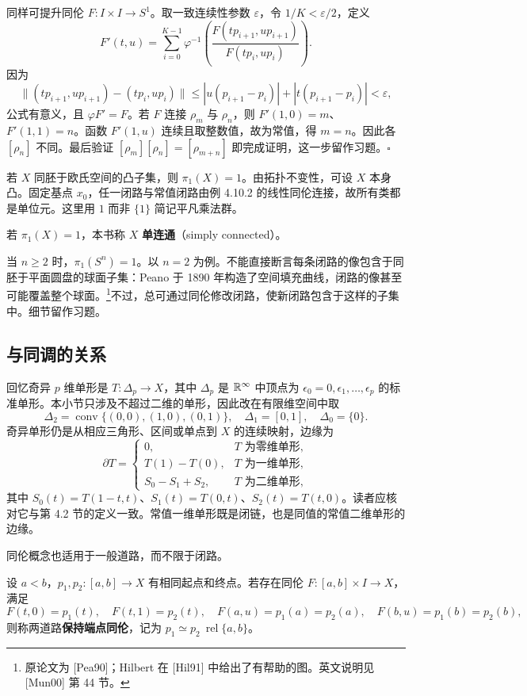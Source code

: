 同样可提升同伦 $F:I\times I\to S^1$。取一致连续性参数 $\varepsilon$，令 $1/K<\varepsilon/2$，定义
\[
F'(t,u)=\sum_{i=0}^{K-1}\varphi^{-1}\left(\frac{F(tp_{i+1},up_{i+1})}{F(tp_i,up_i)}\right).
\]
因为
\[
\|(tp_{i+1},up_{i+1})-(tp_i,up_i)\|
\le |u(p_{i+1}-p_i)|+|t(p_{i+1}-p_i)|<\varepsilon,
\]
公式有意义，且 $\varphi F'=F$。若 $F$ 连接 $\rho_m$ 与 $\rho_n$，则 $F'(1,0)=m$、$F'(1,1)=n$。函数 $F'(1,u)$ 连续且取整数值，故为常值，得 $m=n$。因此各 $[\rho_n]$ 不同。最后验证 $[\rho_m][\rho_n]=[\rho_{m+n}]$ 即完成证明，这一步留作习题。\hfill$\square$

若 $X$ 同胚于欧氏空间的凸子集，则 $\pi_1(X)=1$。由拓扑不变性，可设 $X$ 本身凸。固定基点 $x_0$，任一闭路与常值闭路由例 4.10.2 的线性同伦连接，故所有类都是单位元。这里用 $1$ 而非 $\{1\}$ 简记平凡乘法群。

若 $\pi_1(X)=1$，本书称 $X$ \textbf{单连通}（simply connected）。

当 $n\ge2$ 时，$\pi_1(S^n)=1$。以 $n=2$ 为例。不能直接断言每条闭路的像包含于同胚于平面圆盘的球面子集：Peano 于 1890 年构造了空间填充曲线，闭路的像甚至可能覆盖整个球面。\footnote{原论文为 [Pea90]；Hilbert 在 [Hil91] 中给出了有帮助的图。英文说明见 [Mun00] 第 44 节。}不过，总可通过同伦修改闭路，使新闭路包含于这样的子集中。细节留作习题。

\subsection*{与同调的关系}
回忆奇异 $p$ 维单形是 $T:\Delta_p\to X$，其中 $\Delta_p$ 是 $\mathbb{R}^\infty$ 中顶点为 $\epsilon_0=0,\epsilon_1,\ldots,\epsilon_p$ 的标准单形。本小节只涉及不超过二维的单形，因此改在有限维空间中取
\[
\Delta_2=\operatorname{conv}\{(0,0),(1,0),(0,1)\},\quad\Delta_1=[0,1],\quad\Delta_0=\{0\}.
\]
奇异单形仍是从相应三角形、区间或单点到 $X$ 的连续映射，边缘为
\[
\partial T=\begin{cases}0,&T\text{ 为零维单形},\\T(1)-T(0),&T\text{ 为一维单形},\\S_0-S_1+S_2,&T\text{ 为二维单形},\end{cases}
\]
其中 $S_0(t)=T(1-t,t)$、$S_1(t)=T(0,t)$、$S_2(t)=T(t,0)$。读者应核对它与第 4.2 节的定义一致。常值一维单形既是闭链，也是同值的常值二维单形的边缘。

同伦概念也适用于一般道路，而不限于闭路。

设 $a<b$，$p_1,p_2:[a,b]\to X$ 有相同起点和终点。若存在同伦 $F:[a,b]\times I\to X$，满足
\[
F(t,0)=p_1(t),\quad F(t,1)=p_2(t),\quad
F(a,u)=p_1(a)=p_2(a),\quad F(b,u)=p_1(b)=p_2(b),
\]
则称两道路\textbf{保持端点同伦}，记为 $p_1\simeq p_2\ \operatorname{rel}\{a,b\}$。


